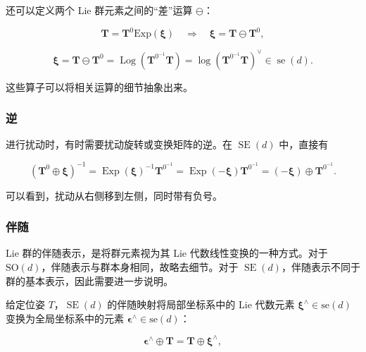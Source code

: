 还可以定义两个 Lie 群元素之间的“差”运算 $\ominus$：

\begin{equation}
\boldsymbol {T} = \boldsymbol {T} ^ {0} \mathrm{Exp} (\boldsymbol {\xi}) \quad \Longrightarrow \quad \boldsymbol {\xi} = \boldsymbol {T} \ominus \boldsymbol {T} ^ {0},\tag{2.25a}
\end{equation}

\begin{equation}
\boldsymbol {\xi} = \boldsymbol {T} \ominus \boldsymbol {T} ^ {0} = \operatorname{Log} \left(\boldsymbol {T} ^ {0^{-1}} \boldsymbol {T}\right) = \log \left(\boldsymbol {T} ^ {0^{-1}} \boldsymbol {T}\right) ^ {\vee} \in \operatorname{se} (d).\tag{2.25b}
\end{equation}

这些算子可以将相关运算的细节抽象出来。

\subsubsection{逆}

进行扰动时，有时需要扰动旋转或变换矩阵的逆。在 $\operatorname{SE}(d)$ 中，直接有

\begin{equation}
\left(\boldsymbol {T} ^ {0} \oplus \boldsymbol {\xi}\right) ^ {- 1} = \operatorname{Exp}(\boldsymbol {\xi}) ^ {- 1} \boldsymbol {T} ^ {0^{-1}} = \operatorname{Exp}(-\boldsymbol {\xi}) \boldsymbol {T} ^ {0^{-1}} = (-\boldsymbol {\xi}) \oplus \boldsymbol {T} ^ {0^{-1}}.\tag{2.26}
\end{equation}

可以看到，扰动从右侧移到左侧，同时带有负号。

\subsubsection{伴随}

Lie 群的伴随表示，是将群元素视为其 Lie 代数线性变换的一种方式。对于 $\mathrm{SO}(d)$，伴随表示与群本身相同，故略去细节。对于 $\operatorname{SE}(d)$，伴随表示不同于群的基本表示，因此需要进一步说明。

给定位姿 $T$，$\operatorname{SE}(d)$ 的伴随映射将局部坐标系中的 Lie 代数元素 $\pmb\xi^\wedge\in\mathrm{se}(d)$ 变换为全局坐标系中的元素 $\pmb\epsilon^\wedge\in\mathrm{se}(d)$：

\begin{equation}
\boldsymbol {\epsilon} ^ {\wedge} \oplus \boldsymbol {T} = \boldsymbol {T} \oplus \boldsymbol {\xi} ^ {\wedge},\tag{2.27}
\end{equation}

